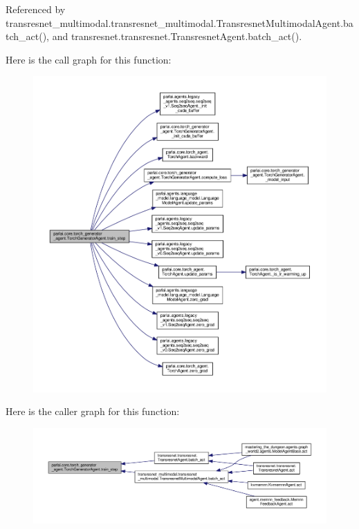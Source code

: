 Referenced by transresnet\+\_\+multimodal.\+transresnet\+\_\+multimodal.\+Transresnet\+Multimodal\+Agent.\+batch\+\_\+act(), and transresnet.\+transresnet.\+Transresnet\+Agent.\+batch\+\_\+act().

Here is the call graph for this function\+:
\nopagebreak
\begin{figure}[H]
\begin{center}
\leavevmode
\includegraphics[width=350pt]{classparlai_1_1core_1_1torch__generator__agent_1_1TorchGeneratorAgent_afe2226ddfc838ec27580e3499cc0bae7_cgraph}
\end{center}
\end{figure}
Here is the caller graph for this function\+:
\nopagebreak
\begin{figure}[H]
\begin{center}
\leavevmode
\includegraphics[width=350pt]{classparlai_1_1core_1_1torch__generator__agent_1_1TorchGeneratorAgent_afe2226ddfc838ec27580e3499cc0bae7_icgraph}
\end{center}
\end{figure}
\mbox{\label{classparlai_1_1core_1_1torch__generator__agent_1_1TorchGeneratorAgent_a8bb3183c7de0e8831157536c6ce1751b}} 
